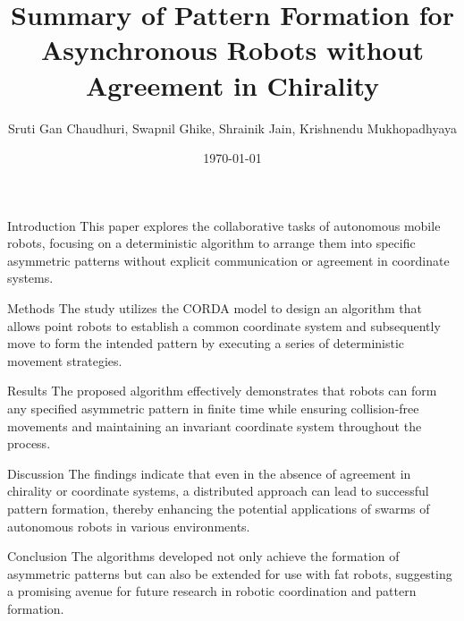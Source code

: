 \documentclass{beamer}
\title{Summary of Pattern Formation for Asynchronous Robots without Agreement in Chirality}
\author{Sruti Gan Chaudhuri, Swapnil Ghike, Shrainik Jain, Krishnendu Mukhopadhyaya}
\date{\today}
\begin{document}
\frame{\titlepage}

\begin{frame}{Introduction}
    This paper explores the collaborative tasks of autonomous mobile robots, focusing on a deterministic algorithm to arrange them into specific asymmetric patterns without explicit communication or agreement in coordinate systems.
\end{frame}

\begin{frame}{Methods}
    The study utilizes the CORDA model to design an algorithm that allows point robots to establish a common coordinate system and subsequently move to form the intended pattern by executing a series of deterministic movement strategies.
\end{frame}

\begin{frame}{Results}
    The proposed algorithm effectively demonstrates that robots can form any specified asymmetric pattern in finite time while ensuring collision-free movements and maintaining an invariant coordinate system throughout the process.
\end{frame}

\begin{frame}{Discussion}
    The findings indicate that even in the absence of agreement in chirality or coordinate systems, a distributed approach can lead to successful pattern formation, thereby enhancing the potential applications of swarms of autonomous robots in various environments.
\end{frame}

\begin{frame}{Conclusion}
    The algorithms developed not only achieve the formation of asymmetric patterns but can also be extended for use with fat robots, suggesting a promising avenue for future research in robotic coordination and pattern formation.
\end{frame}
\end{document}

